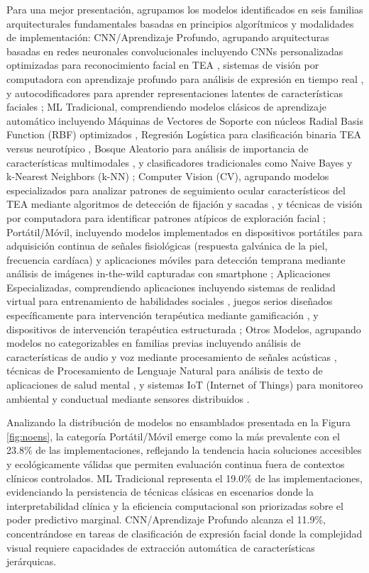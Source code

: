 \documentclass{ieeeaccess}
\begin{document}
	Para una mejor presentación, agrupamos los modelos identificados en seis familias arquitecturales fundamentales basadas en principios algorítmicos y modalidades de implementación: CNN/Aprendizaje Profundo, agrupando arquitecturas basadas en redes neuronales convolucionales incluyendo CNNs personalizadas optimizadas para reconocimiento facial en TEA \cite{b11}, sistemas de visión por computadora con aprendizaje profundo para análisis de expresión en tiempo real \cite{b13}, y autocodificadores para aprender representaciones latentes de características faciales \cite{b20}; ML Tradicional, comprendiendo modelos clásicos de aprendizaje automático incluyendo Máquinas de Vectores de Soporte con núcleos Radial Basis Function (RBF) optimizados \cite{b20}, Regresión Logística para clasificación binaria TEA versus neurotípico \cite{b11}, Bosque Aleatorio para análisis de importancia de características multimodales \cite{b11}, y clasificadores tradicionales como Naive Bayes y k-Nearest Neighbors (k-NN) \cite{b9}; Computer Vision (CV), agrupando modelos especializados para analizar patrones de seguimiento ocular característicos del TEA mediante algoritmos de detección de fijación y sacadas \cite{b3,b6}, y técnicas de visión por computadora para identificar patrones atípicos de exploración facial \cite{b13,b18}; Portátil/Móvil, incluyendo modelos implementados en dispositivos portátiles para adquisición continua de señales fisiológicas (respuesta galvánica de la piel, frecuencia cardíaca) \cite{b23} y aplicaciones móviles para detección temprana mediante análisis de imágenes in-the-wild capturadas con smartphone \cite{b12,b18}; Aplicaciones Especializadas, comprendiendo aplicaciones incluyendo sistemas de realidad virtual para entrenamiento de habilidades sociales \cite{b24,b25}, juegos serios diseñados específicamente para intervención terapéutica mediante gamificación \cite{b17}, y dispositivos de intervención terapéutica estructurada \cite{b26}; Otros Modelos, agrupando modelos no categorizables en familias previas incluyendo análisis de características de audio y voz mediante procesamiento de señales acústicas \cite{b27}, técnicas de Procesamiento de Lenguaje Natural para análisis de texto de aplicaciones de salud mental \cite{b11}, y sistemas IoT (Internet of Things) para monitoreo ambiental y conductual mediante sensores distribuidos \cite{b28,b29}.
	
	Analizando la distribución de modelos no ensamblados presentada en la Figura \ref{fig:noens}, la categoría Portátil/Móvil emerge como la más prevalente con el 23.8\% de las implementaciones, reflejando la tendencia hacia soluciones accesibles y ecológicamente válidas que permiten evaluación continua fuera de contextos clínicos controlados. ML Tradicional representa el 19.0\% de las implementaciones, evidenciando la persistencia de técnicas clásicas en escenarios donde la interpretabilidad clínica y la eficiencia computacional son priorizadas sobre el poder predictivo marginal. CNN/Aprendizaje Profundo alcanza el 11.9\%, concentrándose en tareas de clasificación de expresión facial donde la complejidad visual requiere capacidades de extracción automática de características jerárquicas.
	
\end{document}
